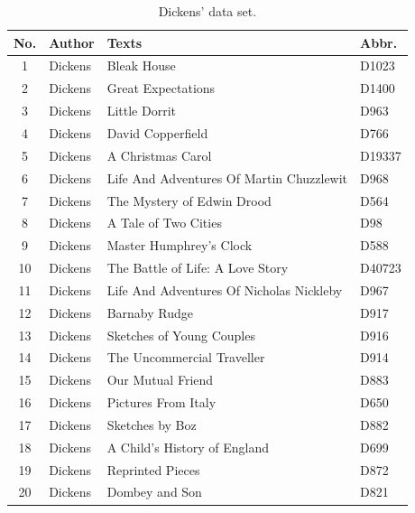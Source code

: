 \documentclass[a4paper,10pt,twoside,fleqn]{article}
\begin{document}
\begin{table}[!htb]
    \begin{minipage}{.6\linewidth}
    \centering
      \caption{Dickens' data set.} %
      
      \label{table:Dickens-data}
      \small
\begin{tabular}{c l l l} \\\hline \hline
\textbf{No.} 	& \textbf{Author} 	& \textbf{Texts} 			& \textbf{Abbr.} \\ \hline
1   		& Dickens 		& Bleak House 				& D1023     \\
2   		& Dickens		& Great Expectations			& D1400      \\
3		& Dickens      		& Little Dorrit     			& D963       \\
4		& Dickens      		& David Copperfield     		& D766        \\
5		& Dickens      		& A Christmas Carol     		& D19337       \\
6   		& Dickens		& Life And Adventures Of Martin Chuzzlewit	& D968        \\
7		& Dickens		& The Mystery of Edwin Drood		& D564   \\
8		& Dickens      		& A Tale of Two Cities                  & D98      \\
9		& Dickens		& Master Humphrey's Clock		& D588           \\
10		& Dickens		& The Battle of Life: A Love Story      & D40723              \\
11		& Dickens		&Life And Adventures Of Nicholas Nickleby	& D967          \\  
12		& Dickens		&Barnaby Rudge      			& D917             \\
13		& Dickens		& Sketches of Young Couples		& D916        \\
14		& Dickens		& The Uncommercial Traveller            & D914           \\
15		& Dickens		& Our Mutual Friend			& D883           \\
16		& Dickens		& Pictures From Italy			& D650    \\
17		& Dickens		& Sketches by Boz			& D882      \\
18		& Dickens		& A Child's History of England       	& D699  \\
19		& Dickens		& Reprinted Pieces			& D872   \\
20		& Dickens		& Dombey and Son			& D821     \\

\end{tabular}
\end{minipage}
\end{table}
\end{document}
